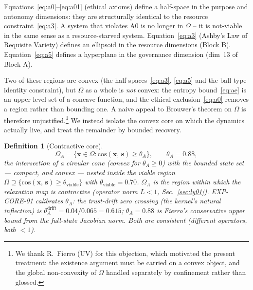 \documentclass[11pt, a4paper]{article}
\newtheorem{definition}{Definition}
\newcommand{\stasis}{\bm{s}}
\newcommand{\sv}{\bm{x}}
\newcommand{\cosim}[2]{\mathrm{cos}\!\left(#1,\, #2\right)}
\begin{document}
Equations~\eqref{eq:a0}--\eqref{eq:a01} (ethical axioms) define
a half-space in the purpose and autonomy dimensions:
they are structurally identical to the resource constraint~\eqref{eq:a3}.
A system that violates A0 is no longer in $\Omega$ -- it is not-viable
in the same sense as a resource-starved system.
Equation~\eqref{eq:a3} (Ashby's Law of Requisite Variety) defines an
ellipsoid in the resource dimensions (Block B).
Equation~\eqref{eq:a5} defines a hyperplane in the governance dimension
(dim~13 of Block A).

Two of these regions are convex (the half-spaces~\eqref{eq:a3},
\eqref{eq:a5} and the ball-type identity constraint), but $\Omega$ as a whole
is \emph{not} convex: the entropy bound~\eqref{eq:ae} is an upper level set of a
concave function, and the ethical exclusion~\eqref{eq:a0} removes a region
rather than bounding one. A naive appeal to Brouwer's theorem on $\Omega$ is
therefore unjustified.\footnote{We thank R.\ Fierro (UV) for this objection,
which motivated the present treatment: the existence argument must be carried on
a convex object, and the global non-convexity of $\Omega$ handled separately by
confinement rather than glossed.} We instead isolate the convex core on which
the dynamics actually live, and treat the remainder by bounded recovery.

\begin{definition}[Contractive core]
\label{def:omega_a}
\begin{equation}
  \Omega_A = \bigl\{ \sv \in \Omega : \cosim{\sv}{\stasis} \ge \theta_A \bigr\},
  \qquad \theta_A = 0.88,
\end{equation}
the intersection of a circular cone (convex for $\theta_A \ge 0$) with the
bounded state set --- compact, and convex --- nested inside the viable region
$\Omega \supseteq \{\cosim{\sv}{\stasis} \ge \theta_\text{viable}\}$ with
$\theta_\text{viable} = 0.70$. $\Omega_A$ is the region within which the
relaxation map is contractive (operator norm $L < 1$, Sec.~\ref{sec:ly01}).
EXP-CORE-01 calibrates $\theta_A$: the trust-drift zero crossing (the kernel's
natural inflection) is $\theta_A^{\text{drift}} = 0.04/0.065 = 0.615$;
$\theta_A = 0.88$ is Fierro's conservative upper bound from the full-state
Jacobian norm. Both are consistent (different operators, both ${<}1$).
\end{definition}
\end{document}
